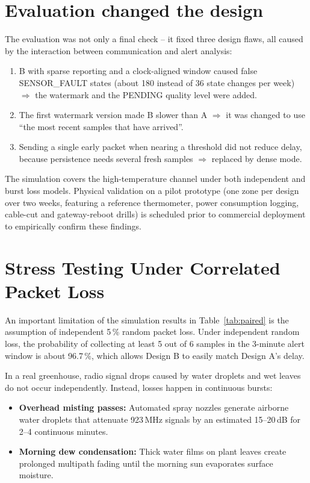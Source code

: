 \documentclass[11pt,a4paper]{report}
\begin{document}
\section{Evaluation changed the design}
The evaluation was not only a final check -- it fixed three design flaws, all caused by the interaction between communication and alert analysis:
\begin{enumerate}[noitemsep]
  \item B with sparse reporting and a clock-aligned window caused false SENSOR\_FAULT states (about 180 instead of 36 state changes per week) $\Rightarrow$ the watermark and the PENDING quality level were added.
  \item The first watermark version made B slower than A $\Rightarrow$ it was changed to use ``the most recent samples that have arrived''.
  \item Sending a single early packet when nearing a threshold did not reduce delay, because persistence needs several fresh samples $\Rightarrow$ replaced by dense mode.
\end{enumerate}
The simulation covers the high-temperature channel under both independent and burst loss models. Physical validation on a pilot prototype (one zone per design over two weeks, featuring a reference thermometer, power consumption logging, cable-cut and gateway-reboot drills) is scheduled prior to commercial deployment to empirically confirm these findings.

\section{Stress Testing Under Correlated Packet Loss}\label{sec:threats}
An important limitation of the simulation results in Table~\ref{tab:paired} is the assumption of independent 5\,\% random packet loss. Under independent random loss, the probability of collecting at least 5 out of 6 samples in the 3-minute alert window is about 96.7\,\%, which allows Design B to easily match Design A's delay.

In a real greenhouse, radio signal drops caused by water droplets and wet leaves do not occur independently. Instead, losses happen in continuous bursts:
\begin{itemize}[noitemsep]
  \item \textbf{Overhead misting passes:} Automated spray nozzles generate airborne water droplets that attenuate 923\,MHz signals by an estimated 15--20\,dB for 2--4 continuous minutes.
  \item \textbf{Morning dew condensation:} Thick water films on plant leaves create prolonged multipath fading until the morning sun evaporates surface moisture.
\end{itemize}
\end{document}
